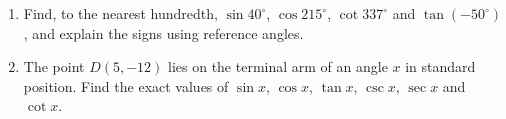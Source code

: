 \begin{enumerate}
\item[(a)] Find, to the nearest hundredth, $\sin40^\circ$, $\cos215^\circ$, $\cot337^\circ$ and $\tan(-50^\circ)$, and explain the signs using reference angles.
\item[(b)] The point $D(5,-12)$ lies on the terminal arm of an angle $x$ in standard position. Find the exact values of $\sin x$, $\cos x$, $\tan x$, $\csc x$, $\sec x$ and $\cot x$.
\end{enumerate}
